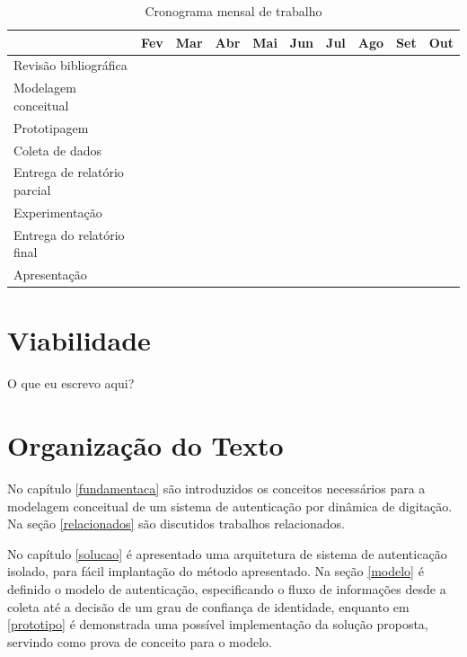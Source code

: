 \documentclass[pfc]{imetex}
\begin{document}
\begin{table}[htb]
\begin{tabular}{|l|c|c|c|c|c|c|c|c|c|}
\hline
& Fev & Mar & Abr & Mai & Jun & Jul & Ago & Set & Out \\
\hline
Revisão bibliográfica &
\multicolumn{2}{c}{\cellcolor[gray]{0.5}} &
\multicolumn{6}{c}{} &
\\
\hline
Modelagem conceitual &
\multicolumn{1}{c}{} &
\multicolumn{3}{c}{\cellcolor[gray]{0.5}} &
\multicolumn{4}{c}{} &
\\
\hline
Prototipagem &
\multicolumn{2}{c}{} &
\multicolumn{3}{c}{\cellcolor[gray]{0.5}} &
\multicolumn{3}{c}{} &
\\
\hline
Coleta de dados &
\multicolumn{4}{c}{} &
\multicolumn{1}{c}{\cellcolor[gray]{0.5}} &
\multicolumn{3}{c}{} &
\\
\hline
Entrega de relatório parcial &
\multicolumn{3}{c}{} &
\multicolumn{1}{c}{\cellcolor[gray]{0.5}} &
\multicolumn{1}{c}{} &
\multicolumn{1}{c}{\cellcolor[gray]{0.5}} &
\multicolumn{2}{c}{} &
\\
\hline
Experimentação &
\multicolumn{5}{c}{} &
\multicolumn{2}{c}{\cellcolor[gray]{0.5}} &
\multicolumn{1}{c}{} &
\\
\hline
Entrega do relatório final &
\multicolumn{7}{c}{} &
\multicolumn{1}{c}{\cellcolor[gray]{0.5}} &
\\
\hline
Apresentação &
\multicolumn{8}{c}{} &
\multicolumn{1}{c}{\cellcolor[gray]{0.5}}
\\
\hline
\end{tabular}

\caption{Cronograma mensal de trabalho}
\end{table}

\section{Viabilidade}
O que eu escrevo aqui?

\section{Organização do Texto}
No capítulo \ref{fundamentaca} são introduzidos os conceitos necessários para a modelagem conceitual de um sistema de autenticação por dinâmica de digitação. Na seção \ref{relacionados} são discutidos trabalhos relacionados.

No capítulo \ref{solucao} é apresentado uma arquitetura de sistema de autenticação isolado, para fácil implantação do método apresentado. Na seção \ref{modelo} é definido o modelo de autenticação, especificando o fluxo de informações desde a coleta até a decisão de um grau de confiança de identidade, enquanto em \ref{prototipo} é demonstrada uma possível implementação da solução proposta, servindo como prova de conceito para o modelo.
\end{document}
